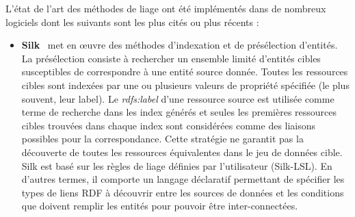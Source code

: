 L'état de l'art des méthodes de liage ont été implémentés dans de nombreux logiciels dont les suivants sont les plus cités ou plus récents :


\begin{itemize}

\item \textbf{Silk}~\cite{Jentzsch} met en \oe uvre des méthodes d'indexation et de présélection d'entités. La présélection consiste à rechercher un ensemble limité d’entités cibles susceptibles de correspondre à une entité source donnée. Toutes les ressources cibles sont indexées par une ou plusieurs valeurs de propriété spécifiée (le plus souvent, leur label). Le \textit{rdfs:label} d'une ressource source est utilisée comme terme de recherche dans les index générés et seules les premières ressources cibles trouvées dans chaque index sont considérées comme des liaisons possibles pour la correspondance. Cette stratégie ne garantit pas la découverte de toutes les ressources équivalentes dans le jeu de données cible. Silk est basé sur les règles de liage définies par l'utilisateur (Silk-LSL). En d'autres termes, il comporte un langage déclaratif permettant de spécifier les types de liens RDF à découvrir entre les sources de données et les conditions que doivent remplir les entités pour pouvoir être inter-connectées.\\


\end{itemize}
